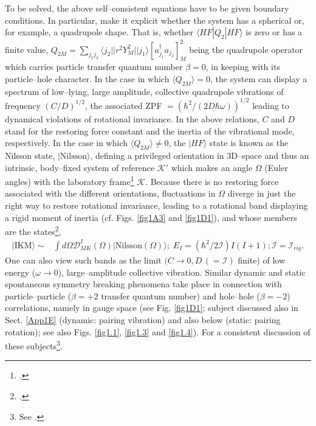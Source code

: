 To be solved, the above self--consistent equations have to be given boundary conditions. In particular, make it explicit whether the system has a spherical or, for example, a quadrupole  shape.   That is, whether $\langle HF|Q_2|HF\rangle$ is zero or has a finite value, $Q_{2M}=\sum_{j_1j_2}\langle j_2||r^2Y^2_M||j_1\rangle \left[a^\dagger_{j_1}a_{j_2}\right]^2_M$ being the quadrupole operator which carries particle transfer quantum number $\beta=0$, in keeping with its particle--hole character. In the case in which $\langle Q_{2M}\rangle=0$, the system can display a spectrum of low--lying, large amplitude, collective quadrupole vibrations of frequency $(C/D)^{1/2}$, the associated ZPF $=\left(\hbar^2/(2D\hbar\omega)\right)^{1/2}$ leading to dynamical violations of rotational invariance. In the above relations, $C$ and $D$ stand for the restoring force constant and the inertia of the vibrational mode, respectively. In the case in which $\langle Q_{2M}\rangle\neq0$, the $|HF\rangle$ state is known as the Nilsson state, $|\text{Nilsson}\rangle$, defining a privileged orientation in 3D--space and thus an intrinsic, body--fixed system of reference $\mathcal{K}'$ which makes an angle $\Omega$ (Euler angles) with the laboratory frame\footnote{\cite{Nilsson:55}.} $\mathcal{K}$. Because there is no restoring force associated with the different orientations, fluctuations in $\Omega$ diverge in just the right way to restore rotational invariance, leading to a rotational band displaying a rigid moment of inertia (cf. Figs. \ref{fig1A3} and \ref{fig1D1}), and whose members are the states\footnote{\cite{Bohr:75}.},
 \begin{equation}\label{eq2.4.3}
\begin{split}
|\text{IKM}\rangle\sim&\int d\Omega \mathcal{D}_{MK}^I(\Omega)|\text{Nilsson}(\Omega)\rangle;\; E_I=(\hbar^2/2\mathcal I)I(I+1); \mathcal{I}=\mathcal{I}_{rig}.
\end{split}
\end{equation}
One can also view such bands as the limit $(C\rightarrow 0, D\,(=\mathcal I)$ finite) of low energy ($\omega\rightarrow 0$), large--amplitude collective vibration. 
Similar dynamic and static spontaneous symmetry breaking phenomena take place in connection with particle--particle ($\beta=+2$ transfer quantum number) and hole--hole ($\beta=-2$) correlations, namely in gauge space (see Fig. \ref{fig1D1}; subject discussed also in Sect. \ref{App1E} (dynamic: pairing vibration) and also below (static: pairing rotation); see also Figs. \ref{fig1.1}, \ref{fig1.3} and \ref{fig1.4}). For a consistent discussion of these subjects\footnote{See \cite{Bes:90}.}.




